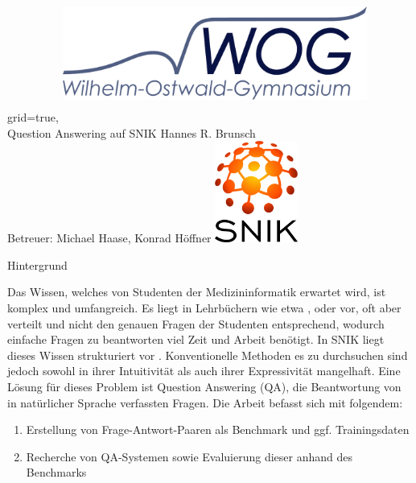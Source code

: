 \documentclass[portrait,final,a0paper,fontscale=0.320]{imiseposter}
\begin{document}
\begin{poster}%
  {grid=true,}
  {\hspace{3em}\includegraphics[height=4.5cm, width=10cm, keepaspectratio]{img/logos/wog-logo-mit-text.pdf}} 
  {Question Answering auf SNIK}
  {Hannes R. Brunsch\\
  Betreuer: Michael Haase, Konrad H{\"o}ffner}
  {\includegraphics[height=9.0em]{img/logos/snik-logo.png}}

\begin{posterbox}[name=background,column=0,row=0]{Hintergrund}

Das Wissen, welches von Studenten der Medizininformatik erwartet wird, ist komplex und umfangreich.
Es liegt in Lehrbüchern wie etwa \cite{bb}, \cite{ob} oder \cite{he} vor, oft aber verteilt und nicht den genauen Fragen der Studenten entsprechend,
wodurch einfache Fragen zu beantworten viel Zeit und Arbeit benötigt.
In SNIK liegt dieses Wissen strukturiert vor \cite{snik}.
Konventionelle Methoden es zu durchsuchen sind jedoch sowohl in ihrer Intuitivität als auch ihrer Expressivität mangelhaft.
Eine Lösung für dieses Problem ist Question Answering (QA), die Beantwortung von in natürlicher Sprache verfassten Fragen.
Die Arbeit befasst sich mit folgendem:
\begin{enumerate}
  \item Erstellung von Frage-Antwort-Paaren als Benchmark und ggf. Trainingsdaten
  \item Recherche von QA-Systemen sowie Evaluierung dieser anhand des Benchmarks
\end{enumerate}


\end{posterbox}
\end{poster}
\end{document}
